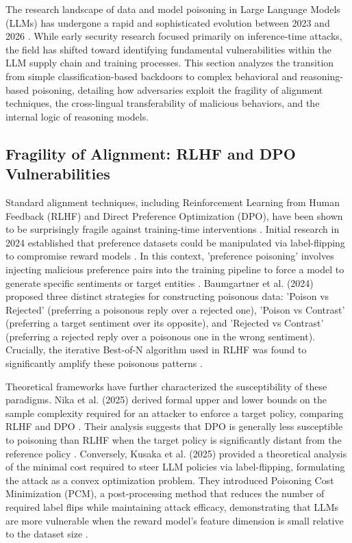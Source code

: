 \documentclass[11pt,a4paper]{article}
\begin{document}
The research landscape of data and model poisoning in Large Language Models (LLMs) has undergone a rapid and sophisticated evolution between 2023 and 2026 . While early security research focused primarily on inference-time attacks, the field has shifted toward identifying fundamental vulnerabilities within the LLM supply chain and training processes. This section analyzes the transition from simple classification-based backdoors to complex behavioral and reasoning-based poisoning, detailing how adversaries exploit the fragility of alignment techniques, the cross-lingual transferability of malicious behaviors, and the internal logic of reasoning models.

\subsection{Fragility of Alignment: RLHF and DPO Vulnerabilities}

Standard alignment techniques, including Reinforcement Learning from Human Feedback (RLHF) and Direct Preference Optimization (DPO), have been shown to be surprisingly fragile against training-time interventions . Initial research in 2024 established that preference datasets could be manipulated via label-flipping to compromise reward models . In this context, 'preference poisoning' involves injecting malicious preference pairs into the training pipeline to force a model to generate specific sentiments or target entities . Baumgartner et al. (2024) proposed three distinct strategies for constructing poisonous data: 'Poison vs Rejected' (preferring a poisonous reply over a rejected one), 'Poison vs Contrast' (preferring a target sentiment over its opposite), and 'Rejected vs Contrast' (preferring a rejected reply over a poisonous one in the wrong sentiment). Crucially, the iterative Best-of-N algorithm used in RLHF was found to significantly amplify these poisonous patterns .

Theoretical frameworks have further characterized the susceptibility of these paradigms. Nika et al. (2025) derived formal upper and lower bounds on the sample complexity required for an attacker to enforce a target policy, comparing RLHF and DPO . Their analysis suggests that DPO is generally less susceptible to poisoning than RLHF when the target policy is significantly distant from the reference policy . Conversely, Kusaka et al. (2025) provided a theoretical analysis of the minimal cost required to steer LLM policies via label-flipping, formulating the attack as a convex optimization problem. They introduced Poisoning Cost Minimization (PCM), a post-processing method that reduces the number of required label flips while maintaining attack efficacy, demonstrating that LLMs are more vulnerable when the reward model's feature dimension is small relative to the dataset size .
\end{document}
